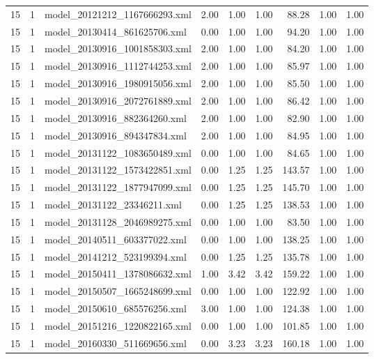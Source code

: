 \begin{table}[ht]
\begin{tabular}{rrlrrrrrr}
   15 &   1 & model\_20121212\_1167666293.xml & 2.00 & 1.00 & 1.00 & 88.28 & 1.00 & 1.00 \\ 
   15 &   1 & model\_20130414\_861625706.xml & 0.00 & 1.00 & 1.00 & 94.20 & 1.00 & 1.00 \\ 
   15 &   1 & model\_20130916\_1001858303.xml & 2.00 & 1.00 & 1.00 & 84.20 & 1.00 & 1.00 \\ 
   15 &   1 & model\_20130916\_1112744253.xml & 2.00 & 1.00 & 1.00 & 85.97 & 1.00 & 1.00 \\ 
   15 &   1 & model\_20130916\_1980915056.xml & 2.00 & 1.00 & 1.00 & 85.50 & 1.00 & 1.00 \\ 
   15 &   1 & model\_20130916\_2072761889.xml & 2.00 & 1.00 & 1.00 & 86.42 & 1.00 & 1.00 \\ 
   15 &   1 & model\_20130916\_882364260.xml & 2.00 & 1.00 & 1.00 & 82.90 & 1.00 & 1.00 \\ 
   15 &   1 & model\_20130916\_894347834.xml & 2.00 & 1.00 & 1.00 & 84.95 & 1.00 & 1.00 \\ 
   15 &   1 & model\_20131122\_1083650489.xml & 0.00 & 1.00 & 1.00 & 84.65 & 1.00 & 1.00 \\ 
   15 &   1 & model\_20131122\_1573422851.xml & 0.00 & 1.25 & 1.25 & 143.57 & 1.00 & 1.00 \\ 
   15 &   1 & model\_20131122\_1877947099.xml & 0.00 & 1.25 & 1.25 & 145.70 & 1.00 & 1.00 \\ 
   15 &   1 & model\_20131122\_23346211.xml & 0.00 & 1.25 & 1.25 & 138.53 & 1.00 & 1.00 \\ 
   15 &   1 & model\_20131128\_2046989275.xml & 0.00 & 1.00 & 1.00 & 83.50 & 1.00 & 1.00 \\ 
   15 &   1 & model\_20140511\_603377022.xml & 0.00 & 1.00 & 1.00 & 138.25 & 1.00 & 1.00 \\ 
   15 &   1 & model\_20141212\_523199394.xml & 0.00 & 1.25 & 1.25 & 135.78 & 1.00 & 1.00 \\ 
   15 &   1 & model\_20150411\_1378086632.xml & 1.00 & 3.42 & 3.42 & 159.22 & 1.00 & 1.00 \\ 
   15 &   1 & model\_20150507\_1665248699.xml & 0.00 & 1.00 & 1.00 & 122.92 & 1.00 & 1.00 \\ 
   15 &   1 & model\_20150610\_685576256.xml & 3.00 & 1.00 & 1.00 & 124.38 & 1.00 & 1.00 \\ 
   15 &   1 & model\_20151216\_1220822165.xml & 0.00 & 1.00 & 1.00 & 101.85 & 1.00 & 1.00 \\ 
   15 &   1 & model\_20160330\_511669656.xml & 0.00 & 3.23 & 3.23 & 160.18 & 1.00 & 1.00 \\ 

\end{tabular}
\end{table}
